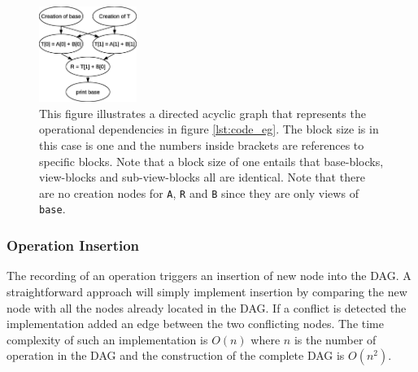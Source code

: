 \documentclass{acm_proc_article-sp}
\begin{document}
\begin{figure}
 \centering
 \includegraphics[width=120px]{gfx/dag}
 \caption{This figure illustrates a directed acyclic graph that represents the operational dependencies in figure \ref{lst:code_eg}. The block size is in this case is one and the numbers inside brackets are references to specific blocks. Note that a block size of one entails that base-blocks, view-blocks and sub-view-blocks all are identical. Note that there are no creation nodes for \texttt{A}, \texttt{R} and \texttt{B} since they are only views of \texttt{base}.}
 \label{fig:DAG}
\end{figure}


\subsubsection{Operation Insertion}
The recording of an operation triggers an insertion of new node into the DAG. A straightforward approach will simply implement insertion by comparing the new node with all the nodes already located in the DAG. If a conflict is detected the implementation added an edge between the two conflicting nodes. The time complexity of such an implementation is $O(n)$ where $n$ is the number of operation in the DAG and the construction of the complete DAG is $O(n^2)$.

\end{document}
